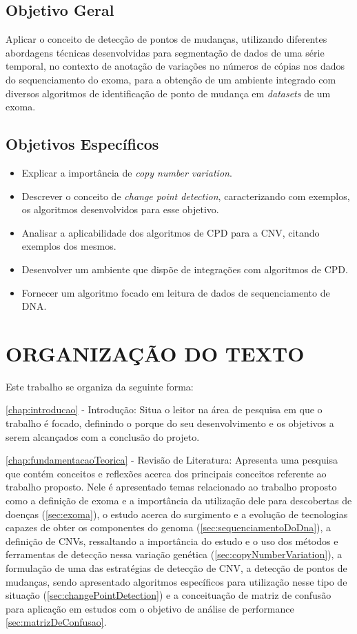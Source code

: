 \subsection{Objetivo Geral}

Aplicar o conceito de detecção de pontos de mudanças, utilizando diferentes abordagens técnicas desenvolvidas para segmentação de dados de uma série temporal, no contexto de anotação de variações no números de cópias nos dados do sequenciamento do exoma, para a obtenção de um ambiente integrado com diversos algoritmos de identificação de ponto de mudança em \textit{datasets} de um exoma.

\subsection{Objetivos Específicos}
	
\begin{itemize}
    \item Explicar a importância de \textit{copy number variation}.
    \item Descrever o conceito de \textit{change point detection}, caracterizando com exemplos, os algoritmos desenvolvidos para esse objetivo.
    \item Analisar a aplicabilidade dos algoritmos de CPD para a CNV, citando exemplos dos mesmos.
    \item Desenvolver um ambiente que dispõe de integrações com algoritmos de CPD.
    \item Fornecer um algoritmo focado em leitura de dados de sequenciamento de DNA.
\end{itemize}

\section{ORGANIZAÇÃO DO TEXTO}

Este trabalho se organiza da seguinte forma: 

\autoref{chap:introducao} - Introdução: Situa o leitor na área de pesquisa em que o trabalho é focado, definindo o porque do seu desenvolvimento e os objetivos a serem alcançados com a conclusão do projeto.

\autoref{chap:fundamentacaoTeorica} - Revisão de Literatura: Apresenta uma pesquisa que contém conceitos e reflexões acerca dos principais conceitos referente ao trabalho proposto. Nele é apresentado temas relacionado ao trabalho proposto como a definição de exoma e a importância da utilização dele para descobertas de doenças (\autoref{sec:exoma}), o estudo acerca do surgimento e a evolução de tecnologias capazes de obter os componentes do genoma (\autoref{sec:sequenciamentoDoDna}), a definição de CNVs, ressaltando a importância do estudo e o uso dos métodos e ferramentas de detecção nessa variação genética (\autoref{sec:copyNumberVariation}), a formulação de uma das estratégias de detecção de CNV, a detecção de pontos de mudanças, sendo apresentado algoritmos específicos para utilização nesse tipo de situação (\autoref{sec:changePointDetection}) e a conceituação de matriz de confusão para aplicação em estudos com o objetivo de análise de performance \autoref{sec:matrizDeConfusao}.

